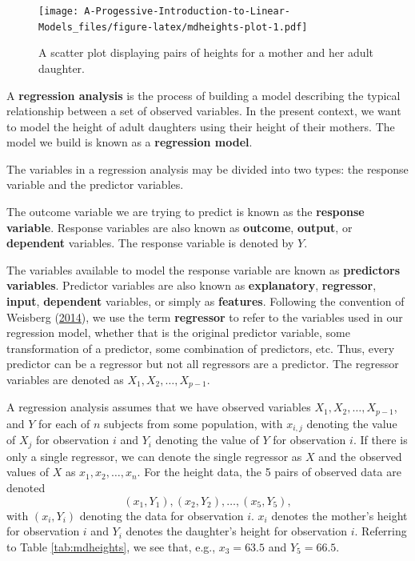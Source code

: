 \documentclass[
]{book}
\theoremstyle{definition}
\theoremstyle{definition}
\theoremstyle{definition}
\theoremstyle{definition}
\theoremstyle{remark}
\begin{document}
\begin{figure}
\centering
\texttt{[image: A-Progessive-Introduction-to-Linear-Models\_files/figure-latex/mdheights-plot-1.pdf]}
\caption{\label{fig:mdheights-plot}A scatter plot displaying pairs of heights for a mother and her adult daughter.}
\end{figure}

A \textbf{regression analysis} is the process of building a model describing the typical relationship between a set of observed variables. In the present context, we want to model the height of adult daughters using their height of their mothers. The model we build is known as a \textbf{regression model}.

The variables in a regression analysis may be divided into two types: the response variable and the predictor variables.

The outcome variable we are trying to predict is known as the \textbf{response variable}. Response variables are also known as \textbf{outcome}, \textbf{output}, or \textbf{dependent} variables. The response variable is denoted by \(Y\).

The variables available to model the response variable are known as \textbf{predictors variables}. Predictor variables are also known as \textbf{explanatory}, \textbf{regressor}, \textbf{input}, \textbf{dependent} variables, or simply as \textbf{features}. Following the convention of Weisberg (\protect\hyperlink{ref-alr4}{2014}), we use the term \textbf{regressor} to refer to the variables used in our regression model, whether that is the original predictor variable, some transformation of a predictor, some combination of predictors, etc. Thus, every predictor can be a regressor but not all regressors are a predictor. The regressor variables are denoted as \(X_1, X_2, \ldots, X_{p-1}\).

A regression analysis assumes that we have observed variables \(X_1, X_2, \ldots, X_{p-1}\), and \(Y\) for each of \(n\) subjects from some population, with \(x_{i,j}\) denoting the value of \(X_j\) for observation \(i\) and \(Y_i\) denoting the value of \(Y\) for observation \(i\). If there is only a single regressor, we can denote the single regressor as \(X\) and the observed values of \(X\) as \(x_1, x_2, \ldots, x_n\). For the height data, the 5 pairs of observed data are denoted
\[(x_1, Y_1), (x_2, Y_2), \ldots, (x_5, Y_5),\]
with \((x_i, Y_i)\) denoting the data for observation \(i\). \(x_i\) denotes the mother's height for observation \(i\) and \(Y_i\) denotes the daughter's height for
observation \(i\). Referring to Table \ref{tab:mdheights}, we see that, e.g., \(x_3 = 63.5\) and \(Y_5= 66.5\).
\end{document}
